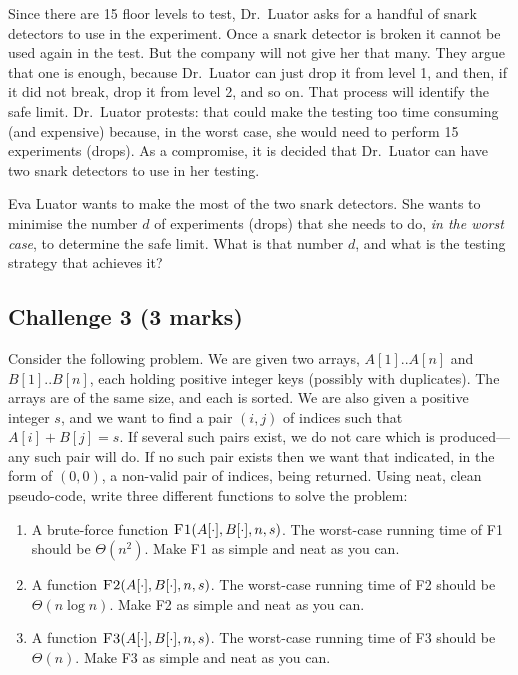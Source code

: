 \documentclass[11pt]{article}
\begin{document}
Since there are 15 floor levels to test, Dr.\ Luator asks for a 
handful of snark detectors to use in the experiment.
Once a snark detector is broken it cannot be used again in the test.
But the company will not give her that many. 
They argue that one is enough, because Dr.\ Luator can just drop it from
level 1, and then, if it did not break, drop it from level 2, and so on.
That process will identify the safe limit.
Dr.\ Luator protests: that could make the testing too time consuming 
(and expensive) because, in the worst case, she would need to perform
15 experiments (drops).
As a compromise, it is decided that Dr.\ Luator can have two snark 
detectors to use in her testing.

Eva Luator wants to make the most of the two snark detectors.
She wants to minimise the number $d$ of experiments (drops) that she
needs to do, \emph{in the worst case}, to determine the safe limit.
What is that number $d$, and what is the testing strategy that achieves it?

\pagebreak
\subsection*{Challenge 3 \hfill {\small (3 marks)}}

Consider the following problem.
We are given two arrays, $A[1]..A[n]$ and $B[1]..B[n]$, 
each holding positive integer keys (possibly with duplicates).
The arrays are of the same size, and each is sorted.
We are also given a positive integer $s$, and we want to find a
pair $(i,j)$ of indices such that $A[i] + B[j] = s$.
If several such pairs exist, we do not care which is produced---any
such pair will do.
If no such pair exists then we want that indicated, 
in the form of $(0,0)$, a non-valid pair of indices, being returned.
Using neat, clean pseudo-code, write three different functions to 
solve the problem:
\begin{enumerate}
\setlength{\itemsep}{-0.4ex}
\item
A brute-force function $\textsc{F1}(A[\cdot],B[\cdot],n,s)$.
The worst-case running time of \textsc{F1} should be $\Theta(n^2)$.
Make \textsc{F1} as simple and neat as you can.
\item
A function
$\textsc{F2}(A[\cdot],B[\cdot],n,s)$.
The worst-case running time of \textsc{F2} should be $\Theta(n \log n)$.
Make \textsc{F2} as simple and neat as you can.
\item
A function $\textsc{F3}(A[\cdot],B[\cdot],n,s)$.
The worst-case running time of \textsc{F3} should be $\Theta(n)$.
Make \textsc{F3} as simple and neat as you can.
\end{enumerate}
\end{document}
